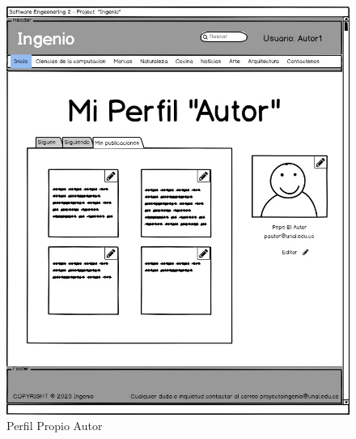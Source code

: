 \documentclass[a4paper,12 pt]{article}
\begin{document}
\begin{figure}[H]
    \centering
    \includegraphics[scale = 1]{images/PerfilPropioAutor.jpg}
    \caption{Perfil Propio Autor}
    \label{F107}
\end{figure}{}
\end{document}
